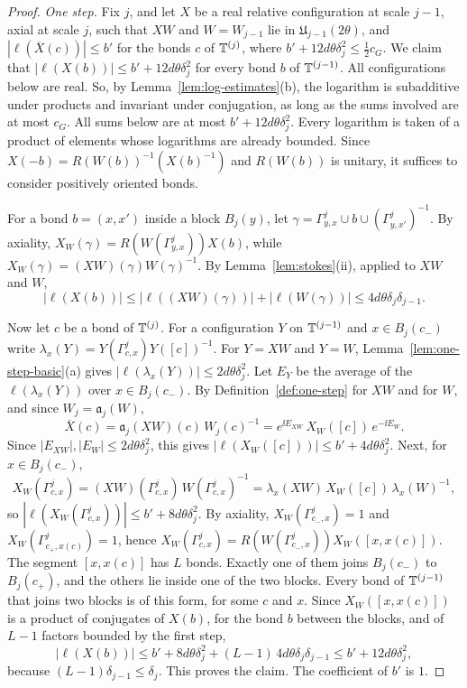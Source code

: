 \begin{proof}
\emph{One step.} Fix $j$, and let $X$ be a real relative configuration at scale $j-1$, axial at scale $j$, such that $XW$ and $W=W_{j-1}$ lie in $\mathfrak U_{j-1}(2\theta)$, and $|\ell(\overline X(c))|\le b'$ for the bonds $c$ of $\mathbb T^{(j)}$, where $b'+12d\theta\delta_j^2\le\frac12c_G$. We claim that $|\ell(X(b))|\le b'+12d\theta\delta_j^2$ for every bond $b$ of $\mathbb T^{(j-1)}$. All configurations below are real. So, by Lemma~\ref{lem:log-estimates}(b), the logarithm is subadditive under products and invariant under conjugation, as long as the sums involved are at most $c_G$. All sums below are at most $b'+12d\theta\delta_j^2$. Every logarithm is taken of a product of elements whose logarithms are already bounded. Since $X(-b)=R(W(b))^{-1}(X(b)^{-1})$ and $R(W(b))$ is unitary, it suffices to consider positively oriented bonds.

For a bond $b=(x,x')$ inside a block $B_j(y)$, let $\gamma=\Gamma^j_{y,x}\cup b\cup(\Gamma^j_{y,x'})^{-1}$. By axiality, $X_W(\gamma)=R(W(\Gamma^j_{y,x}))X(b)$, while $X_W(\gamma)=(XW)(\gamma)W(\gamma)^{-1}$. By Lemma~\ref{lem:stokes}(ii), applied to $XW$ and $W$,
\[
|\ell(X(b))|\le|\ell((XW)(\gamma))|+|\ell(W(\gamma))|\le4d\theta\delta_j\delta_{j-1}.
\]

Now let $c$ be a bond of $\mathbb T^{(j)}$. For a configuration $Y$ on $\mathbb T^{(j-1)}$ and $x\in B_j(c_-)$ write $\lambda_x(Y)=Y(\Gamma^j_{c,x})Y([c])^{-1}$. For $Y=XW$ and $Y=W$, Lemma~\ref{lem:one-step-basic}(a) gives $|\ell(\lambda_x(Y))|\le2d\theta\delta_j^2$. Let $E_Y$ be the average of the $\ell(\lambda_x(Y))$ over $x\in B_j(c_-)$. By Definition~\ref{def:one-step} for $XW$ and for $W$, and since $W_j=\mathfrak a_j(W)$,
\[
\overline X(c)=\mathfrak a_j(XW)(c)\,W_j(c)^{-1}=e^{\ii E_{XW}}\,X_W([c])\,e^{-\ii E_W}.
\]
Since $|E_{XW}|,|E_W|\le2d\theta\delta_j^2$, this gives $|\ell(X_W([c]))|\le b'+4d\theta\delta_j^2$. Next, for $x\in B_j(c_-)$,
\[
X_W(\Gamma^j_{c,x})=(XW)(\Gamma^j_{c,x})\,W(\Gamma^j_{c,x})^{-1}=\lambda_x(XW)\,X_W([c])\,\lambda_x(W)^{-1},
\]
so $|\ell(X_W(\Gamma^j_{c,x}))|\le b'+8d\theta\delta_j^2$. By axiality, $X_W(\Gamma^j_{c_-,x})=1$ and $X_W(\Gamma^j_{c_+,x(c)})=1$, hence $X_W(\Gamma^j_{c,x})=R(W(\Gamma^j_{c_-,x}))X_W([x,x(c)])$. The segment $[x,x(c)]$ has $L$ bonds. Exactly one of them joins $B_j(c_-)$ to $B_j(c_+)$, and the others lie inside one of the two blocks. Every bond of $\mathbb T^{(j-1)}$ that joins two blocks is of this form, for some $c$ and $x$. Since $X_W([x,x(c)])$ is a product of conjugates of $X(b)$, for the bond $b$ between the blocks, and of $L-1$ factors bounded by the first step,
\[
|\ell(X(b))|\le b'+8d\theta\delta_j^2+(L-1)\,4d\theta\delta_j\delta_{j-1}\le b'+12d\theta\delta_j^2,
\]
because $(L-1)\delta_{j-1}\le\delta_j$. This proves the claim. The coefficient of $b'$ is $1$.


\end{proof}
